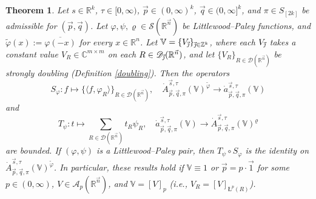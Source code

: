 \documentclass[11pt, reqno]{amsart}
\newtheorem{theorem}{Theorem}[section]
\theoremstyle{definition}
\theoremstyle{remark}
\numberwithin{equation}{section}
\newcommand{\A}{\mathscr A}
\newcommand{\C}{\mathbb C}
\newcommand{\D}{\mathscr D}
\newcommand{\R}{\mathbb R}
\newcommand{\Sc}{\mathscr S}
\newcommand{\V}{\mathbb V}
\newcommand{\Z}{\mathbb Z}
\newcommand{\vj}{\vec{\textit{\j}}}
\newcommand{\vn}{\vec n}
\newcommand{\vp}{\vec p}
\newcommand{\vq}{\vec q}
\newcommand{\vs}{\vec s}
\newcommand{\Atau}{\dot A^{\vs,\tau}_{\vp,\vq,\pi}}
\newcommand{\atau}{\dot a^{\vs,\tau}_{\vp,\vq,\pi}}
\newcommand{\aveL}{\textit{\L}}
\newcommand{\pair}[2]{\langle #1, #2 \rangle}
\begin{document}
\begin{theorem}\label{phi}
Let $s\in\R^k$, $\tau\in[0,\infty)$, $\vp\in(0,\infty)^k$, $\vq\in(0,\infty]^k$, and $\pi\in S_{[2k]}$ be admissible for $(\vp,\vq)$.
Let $\varphi,\psi,\varrho\in\Sc (\R^{\vn})$ be Littlewood--Paley functions, and $\widetilde\varphi(x):=\overline{\varphi(-x)}$ for every $x\in\mathbb{R}^n$.
Let $\V=\{V_{\vj}\}_{\vj\in\Z^k}$, where each $V_{\vj}$ takes a constant value $V_R\in\C^{m\times m}$ on each $R\in\D_{\vj}(\R^{\vn})$, and let $\{V_R\}_{R\in\D(\R^{\vn})}$ be strongly doubling (Definition \ref{doubling}).
Then the operators
\begin{equation*}
S_\varphi:f\mapsto\big\{\pair{f}{\varphi_R}\big\}_{R\in\D(\R^{\vn})},\quad
\Atau(\V)^{\widetilde{\varphi}}\to\atau(\V)
\end{equation*}
and
\begin{equation*}
T_\psi:t\mapsto\sum_{R\in\D(\R^{\vn})}t_R\psi_R,\quad
\atau(\V)\to \Atau(\V)^{\varrho}
\end{equation*}
are bounded.
If $(\varphi,\psi)$ is a Littlewood--Paley pair, then
$T_\psi\circ S_\varphi$ is the identity on $\Atau(\V)^{\widetilde{\varphi}}$.
In particular, these results hold
if $\V\equiv1$ or $\vp=p\cdot\vec1$ for some $p\in(0,\infty)$, $V\in\A_p(\R^{\vn})$,
and $\V=[V]_p$ (i.e., $V_R=[V]_{\aveL^p(R)}$).
\end{theorem}
\end{document}
